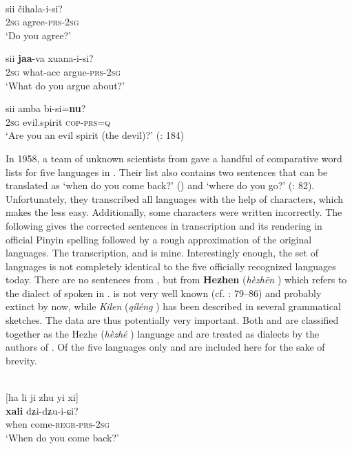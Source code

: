 \ea%
    \label{ex:tungu:45}
    \\
    \ea
    \gll sii  čihala-i-si?\\
    2\textsc{sg}  agree-\textsc{prs}-2\textsc{sg}\\
    \glt ‘Do you agree?’
    
    \ex
    \gll sii \textbf{{jaa}}-va    xuana-i-si?\\
    2\textsc{sg}  what-acc  argue-\textsc{prs}-2\textsc{sg}\\
    \glt ‘What do you argue about?’
    
    \ex
    \gll sii  amba    bi-si=\textbf{{nu}}?\\
    2\textsc{sg}  evil.spirit  \textsc{cop}-\textsc{prs}=\textsc{q}\\
    \glt ‘Are you an evil spirit (the devil)?’ (\citealt{AvrorinBoldyrev2001}: 184)\z\z

In 1958, a team of unknown scientists from  gave a handful of comparative word lists for five  languages in . Their list also contains two sentences that can be translated as ‘when do you come back?’ () and ‘where do you go?’ (\citealt{NDSSLD1958}: 82). Unfortunately, they transcribed all languages with the help of  characters, which makes the  less easy. Additionally, some characters were written incorrectly. The following gives the corrected sentences in  transcription and its rendering in official Pinyin spelling followed by a rough approximation of the original languages. The transcription,  and  is mine. Interestingly enough, the set of languages is not completely identical to the five officially recognized languages today. There are no sentences from , but from \textbf{Hezhen} (\textit{hèzh\=en} ) which refers to the dialect of  spoken in .  is not very well known (cf. \citealt{AnJun1986}: 79–86) and probably extinct by now, while \textit{Kilen} (\textit{qíléng} ) has been described in several grammatical sketches. The  data are thus potentially very important. Both  and  are classified together as the Hezhe (\textit{hèzhé} ) language and are treated as dialects by the authors of \citet{NDSSLD1958}. Of the five languages only  and  are included here for the sake of brevity.

\ea%
    \label{ex:tungu:46}
    \\
    \ea
     [ha li ji zhu yi xi]\\
    \gll \textbf{{xali}} dʑi-dʑu-i-ɕi?\\
    when  come-\textsc{regr-prs-2sg}\\
    \glt ‘When do you come back?’
    
